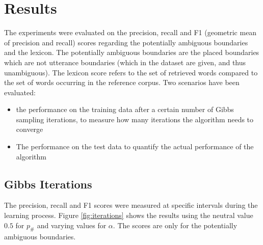 \documentclass[11pt]{article}
\begin{document}
\section{Results}
The experiments were evaluated on the precision, recall and F1 (geometric mean
of precision and recall) scores regarding the potentially ambiguous boundaries
and the lexicon. The potentially ambiguous boundaries are the placed boundaries
which are not utterance boundaries (which in the dataset are given, and thus
unambiguous). The lexicon score refers to the set of retrieved words compared to
the set of words occurring in the reference corpus. Two scenarios have been
evaluated:
\begin{itemize}
  \item the performance on the training data after a certain number of Gibbs
    sampling iterations, to measure how many iterations the algorithm needs to
    converge
  \item The performance on the test data to quantify the actual performance of
    the algorithm
\end{itemize}

\subsection{Gibbs Iterations}
\FloatBarrier
The precision, recall and F1 scores were measured at specific intervals during
the learning process. Figure \ref{fig:iterations} shows the results using the
neutral value $0.5$ for $p_\#$ and varying values for $\alpha$. The scores are
only for the potentially ambiguous boundaries.
\end{document}
